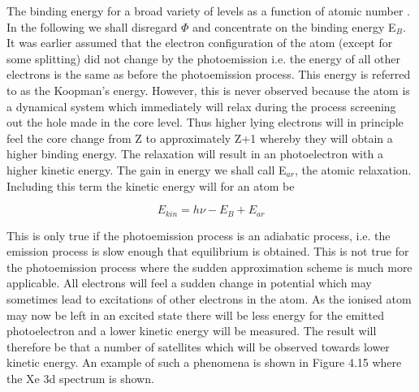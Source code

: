 \vspace*{13cm}
           The binding energy for a broad
          variety of levels as a function of atomic number \cite{siegbahn1}.\\

                                                 In the following we
          shall disregard $\Phi$ and concentrate on the binding energy
          E$_{B}$.  It  was  earlier   assumed   that   the   electron
          configuration of the atom (except for  some  splitting)  did
          not change by the photoemission i.e. the energy of all other
          electrons is the same as before the  photoemission  process.
          This energy is referred to as the Koopman's energy. However,
          this is never observed  because  the  atom  is  a  dynamical
          system which  immediately  will  relax  during  the  process
          screening out the hole made in the core level.  Thus  higher
          lying electrons will in principle feel the core change  from
          Z to approximately Z+1 whereby they  will  obtain  a  higher
          binding  energy.  The   relaxation   will   result   in   an
          photoelectron with a higher  kinetic  energy.  The  gain  in
          energy  we  shall  call  E$_{ar}$,  the  atomic  relaxation.
          Including this term the kinetic energy will for an atom be

\begin{equation}
E_{kin}=h\nu-E_{B}+E_{ar}
\end{equation}


          This is only true if the photoemission process is an
          adiabatic process, i.e. the emission process is slow enough
          that equilibrium is obtained. This is not true for the
          photoemission process where the sudden approximation scheme is
          much more applicable. All electrons will feel a sudden
          change in potential which may sometimes lead to excitations
          of other electrons in the atom. As the ionised atom may now
          be left in an excited state there will be less energy for
          the emitted photoelectron and a lower kinetic energy will be
          measured. The result will therefore be that a number of
          satellites which will be observed towards lower
          kinetic energy. An example of such a phenomena is shown in
          Figure 4.15 where the Xe 3d spectrum is shown.\\

\vspace{13cm}

